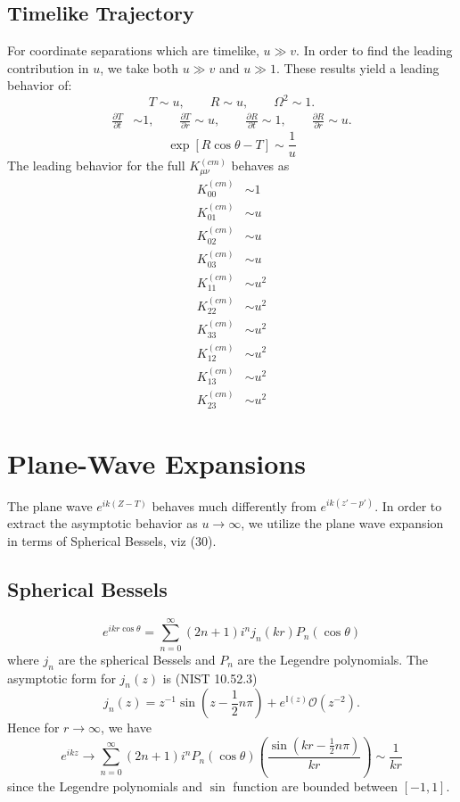 \documentclass[10pt,letterpaper]{article}
\begin{document}
\subsection*{Timelike Trajectory}
For coordinate separations which are timelike, $u\gg v$. In order to find the leading contribution in $u$, we take both $u\gg v$ and $u\gg1$. These results yield a leading behavior of:
\begin{equation}
T\sim u,\qquad R\sim u,\qquad \Omega^2\sim 1. 
\end{equation}
\begin{align}
\frac{\partial T}{\partial t} & \sim  1,\qquad
\frac{\partial T}{\partial r}  \sim  u,\qquad
\frac{\partial R}{\partial t}  \sim 1,\qquad
\frac{\partial R}{\partial r}  \sim  u.
\end{align}
\begin{equation}
\exp[R\cos\theta-T] \sim \frac{1}{u}
\end{equation}
The leading behavior for the full $K_{\mu\nu}^{(cm)}$ behaves as
\begin{align}
K^{(cm)}_{00} &\sim 1 \nonumber\\
K^{(cm)}_{01} &\sim  u\nonumber\\
K^{(cm)}_{02} &\sim  u\nonumber\\
K^{(cm)}_{03} &\sim   u\nonumber\\
K^{(cm)}_{11} &\sim  u^2\nonumber\\
K^{(cm)}_{22} &\sim  u^2\nonumber\\
K^{(cm)}_{33} &\sim  u^2\nonumber\\
K^{(cm)}_{12} &\sim u^2\nonumber\\
K^{(cm)}_{13} &\sim u^2\nonumber\\
K^{(cm)}_{23} &\sim u^2
\end{align}
\section*{Plane-Wave Expansions}
The plane wave $e^{ik(Z-T)}$ behaves much differently from $e^{ik(z'-p')}$. In order to extract the asymptotic behavior as $u\to \infty$, we utilize the plane wave expansion in terms of Spherical Bessels, viz (30). 
\subsection*{Spherical Bessels}
\begin{equation}
e^{ikr\cos\theta} = \sum_{n=0}^\infty (2n+1)i^n j_n(kr)P_n(\cos\theta)
\end{equation}
where $j_n$ are the spherical Bessels and $P_n$ are the Legendre polynomials. The asymptotic form for $j_n(z)$ is (NIST 10.52.3)
\begin{equation}
j_n(z) = z^{-1}\sin(z-\frac12 n\pi)+e^{\mathbb I(z)}\mathcal O(z^{-2}).
\end{equation}
Hence for $r\to\infty$, we have
\begin{equation}
e^{ikz} \to \sum_{n=0}^{\infty}(2n+1)i^nP_n(\cos\theta)\left( \frac{\sin(kr-\frac12 n\pi)}{kr}\right)\sim \frac{1}{kr}
\end{equation}
since the Legendre polynomials and $\sin$ function are bounded between $[-1,1]$. 
\end{document}

